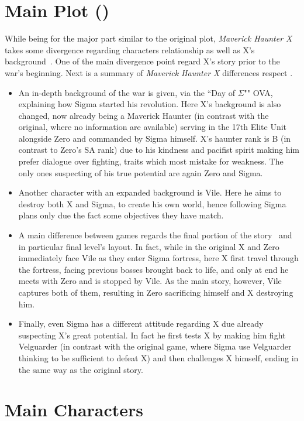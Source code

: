 \section{Main Plot (\mhx)}
While being for the major part similar to the original plot, \textit{Maverick Haunter X} takes some divergence regarding characters relationship as well as X's background~\cite{wiki:MM_MHX}. One of the main divergence point regard X's story prior to the war's beginning. Next is a summary of \textit{Maverick Haunter X} differences respect \x.
\begin{itemize}
\item An in-depth background of the war is given, via the ``Day of $\Sigma$"" OVA, explaining how Sigma started his revolution. Here X's background is also changed, now already being a Maverick Haunter (in contrast with the original, where no information are available) serving in the 17th Elite Unit alongside Zero and commanded by Sigma himself. X's haunter rank is B (in contrast to Zero's SA rank) due to his kindness and pacifist spirit making him prefer dialogue over fighting, traits which most mistake for weakness. The only ones suspecting of his true potential are again Zero and Sigma. 

\item Another character with an expanded background is Vile. Here he aims to destroy both X and Sigma, to create his own world, hence following Sigma plans only due the fact some objectives they have match.

\item A main difference between games regards the final portion of the story~\cite{wiki:MM_MHX_script} and in particular final level's layout. In fact, while in the original X and Zero immediately face Vile as they enter Sigma fortress, here X first travel through the fortress, facing previous bosses brought back to life, and only at end he meets with Zero and is stopped by Vile. As the main story, however, Vile captures both of them, resulting in Zero sacrificing himself and X destroying him. 
\item Finally, even Sigma has a different attitude regarding X due already suspecting X's great potential. In fact he first tests X by making him fight Velguarder (in contrast with the original game, where Sigma use Velguarder thinking to be sufficient to defeat X) and then challenges X himself, ending in the same way as the original story.	
\end{itemize}

\section{Main Characters}
